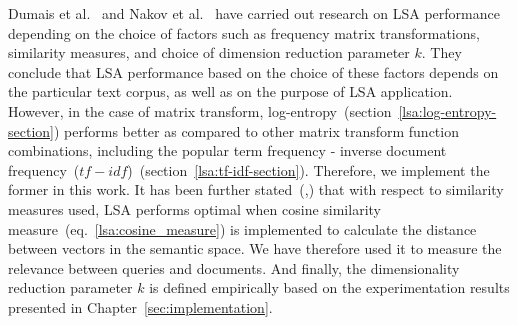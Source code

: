 Dumais et al.~\cite{dumais91improving} and Nakov et al.~\cite{Nakov_weightfunctions} have carried out research on \gls{LSA} performance depending on the choice of factors such as frequency matrix transformations, similarity measures, and choice of dimension reduction parameter $k$. They conclude that \gls{LSA} performance based on the choice of these factors depends on the particular text corpus, as well as on the purpose of \gls{LSA} application. However, in the case of matrix transform, log-entropy~(section~\ref{lsa:log-entropy-section}) performs better as compared to other matrix transform function combinations, including the popular term frequency - inverse document frequency~($tf-idf$)~(section~\ref{lsa:tf-idf-section}). Therefore, we implement the former in this work. It has been further stated~(\cite{dumais91improving},\cite{NakovBetterResultsLSI}) that with respect to similarity measures used, \gls{LSA} performs optimal when cosine similarity measure~(eq.~\ref{lsa:cosine_measure}) is implemented to calculate the distance between vectors in the semantic space. We have therefore used it to measure the relevance between queries and documents. And finally, the dimensionality reduction parameter $k$ is defined empirically based on the experimentation results presented in Chapter~\ref{sec:implementation}.

